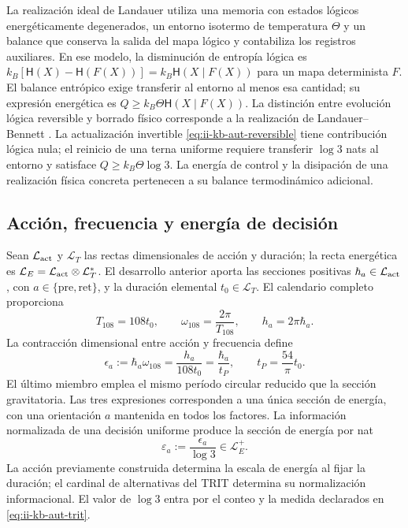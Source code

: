 La realización ideal de Landauer utiliza una memoria con estados lógicos
energéticamente degenerados, un entorno isotermo de temperatura \(\Theta\)
y un balance que conserva la salida del mapa lógico y contabiliza los
registros auxiliares. En ese modelo, la disminución de entropía lógica es
\(k_B[\mathsf H(X)-\mathsf H(F(X))]
=k_B\mathsf H(X\mid F(X))\) para un mapa determinista \(F\).
El balance entrópico exige transferir al entorno al menos esa cantidad;
su expresión energética es \(Q\geq k_B\Theta\mathsf H(X\mid F(X))\).
La distinción entre evolución lógica reversible y borrado físico
corresponde a la realización de Landauer--Bennett \cite{bennett2003}.
La actualización invertible
\eqref{eq:ii-kb-aut-reversible} tiene contribución lógica nula; el
reinicio de una terna uniforme requiere transferir \(\log3\) nats
al entorno y satisface \(Q\geq k_B\Theta\log3\).
La energía de control y la disipación de una realización física
concreta pertenecen a su balance termodinámico adicional.

\subsection{Acción, frecuencia y energía de decisión}

Sean \(\mathcal L_{\rm act}\) y \(\mathcal L_T\) las rectas
dimensionales de acción y duración; la recta energética es
\(\mathcal L_E=\mathcal L_{\rm act}\otimes\mathcal L_T^*\).
El desarrollo anterior aporta las secciones positivas
\(\hbar_a\in\mathcal L_{\rm act}\), con
\(a\in\{\mathrm{pre},\mathrm{ret}\}\), y la duración elemental
\(t_0\in\mathcal L_T\). El calendario completo proporciona
\[
 T_{108}=108t_0,\qquad
 \omega_{108}=\frac{2\pi}{T_{108}},\qquad
 h_a=2\pi\hbar_a.
\]
La contracción dimensional entre acción y frecuencia define
\begin{equation}
 \epsilon_a:=\hbar_a\omega_{108}
 =\frac{h_a}{108t_0}
 =\frac{\hbar_a}{t_P},\qquad
 t_P=\frac{54}{\pi}t_0.
 \label{eq:ii-kb-aut-energia}
\end{equation}
El último miembro emplea el mismo período circular reducido que la
sección gravitatoria. Las tres expresiones corresponden a una única
sección de energía, con una orientación \(a\) mantenida en todos
los factores. La información normalizada de una decisión uniforme
produce la sección de energía por nat
\begin{equation}
 \varepsilon_a:=\frac{\epsilon_a}{\log3}\in\mathcal L_E^+.
 \label{eq:ii-kb-aut-energia-nat}
\end{equation}
La acción previamente construida determina la escala de energía al
fijar la duración; el cardinal de alternativas del TRIT determina su
normalización informacional. El valor de \(\log3\) entra por el
conteo y la medida declarados en \eqref{eq:ii-kb-aut-trit}.

